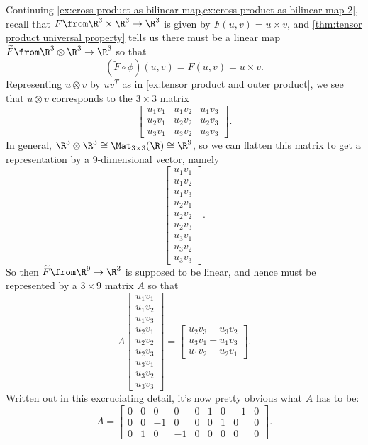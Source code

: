 \begin{example}
	Continuing \cref{ex:cross product as bilinear map,ex:cross product as bilinear map 2}, recall that $F\from \R^3 \times \R^3 \to \R^3$ is given by $F(u,v) = u \times v$, and \cref{thm:tensor product universal property} tells us there must be a linear map $\widetilde{F}\from \R^3 \otimes \R^3 \to \R^3$ so that
	\[
		(\widetilde{F} \circ \phi)(u,v) = F(u,v) = u \times v.
	\]
	Representing $u \otimes v$ by $u v^T$ as in \cref{ex:tensor product and outer product}, we see that $u \otimes v$ corresponds to the $3 \times 3$ matrix 
	\[
		\begin{bmatrix}  u_1 v_1 & u_1 v_2 & u_1 v_3 \\
 u_2 v_1 & u_2 v_2 & u_2 v_3 \\
 u_3 v_1 & u_3 v_2 & u_3 v_3 \end{bmatrix}.
	\]
	In general, $\R^3 \otimes \R^3 \cong \Mat_{3 \times 3}(\R) \cong \R^9$, so we can flatten this matrix to get a representation by a 9-dimensional vector, namely
	\[
		\begin{bmatrix}u_1 v_1 \\
 u_1 v_2 \\
 u_1 v_3 \\
 u_2 v_1 \\
 u_2 v_2 \\
 u_2 v_3 \\
 u_3 v_1 \\
 u_3 v_2 \\
 u_3 v_3\end{bmatrix}.
	\]
	So then $\widetilde{F}\from \R^9 \to \R^3$ is supposed to be linear, and hence must be represented by a $3 \times 9$ matrix $A$ so that
	\[
		A \begin{bmatrix}u_1 v_1 \\
 u_1 v_2 \\
 u_1 v_3 \\
 u_2 v_1 \\
 u_2 v_2 \\
 u_2 v_3 \\
 u_3 v_1 \\
 u_3 v_2 \\
 u_3 v_3\end{bmatrix}  = \begin{bmatrix} u_2 v_3 - u_3 v_2 \\ u_3 v_1 - u_1 v_3 \\ u_1 v_2 - u_2 v_1 \end{bmatrix}.
	\]
	Written out in this excruciating detail, it's now pretty obvious what $A$ has to be:
	\[
		A = \begin{bmatrix} 0 & 0 & 0 & 0 & 0 & 1 & 0 & -1 & 0 \\ 0 & 0 & -1 & 0 & 0 & 0 & 1 & 0 & 0 \\ 0 & 1 & 0 & -1 & 0 & 0 & 0 & 0 & 0 \end{bmatrix}.
	\]
\end{example}

